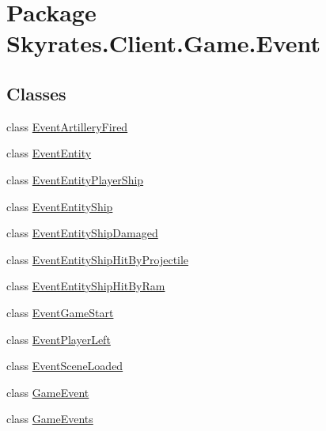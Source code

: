 \hypertarget{namespace_skyrates_1_1_client_1_1_game_1_1_event}{\section{Package Skyrates.\-Client.\-Game.\-Event}
\label{namespace_skyrates_1_1_client_1_1_game_1_1_event}
}
\subsection*{Classes}
\begin{DoxyCompactItemize}
\item 
class \hyperlink{class_skyrates_1_1_client_1_1_game_1_1_event_1_1_event_artillery_fired}{Event\-Artillery\-Fired}
\item 
class \hyperlink{class_skyrates_1_1_client_1_1_game_1_1_event_1_1_event_entity}{Event\-Entity}
\item 
class \hyperlink{class_skyrates_1_1_client_1_1_game_1_1_event_1_1_event_entity_player_ship}{Event\-Entity\-Player\-Ship}
\item 
class \hyperlink{class_skyrates_1_1_client_1_1_game_1_1_event_1_1_event_entity_ship}{Event\-Entity\-Ship}
\item 
class \hyperlink{class_skyrates_1_1_client_1_1_game_1_1_event_1_1_event_entity_ship_damaged}{Event\-Entity\-Ship\-Damaged}
\item 
class \hyperlink{class_skyrates_1_1_client_1_1_game_1_1_event_1_1_event_entity_ship_hit_by_projectile}{Event\-Entity\-Ship\-Hit\-By\-Projectile}
\item 
class \hyperlink{class_skyrates_1_1_client_1_1_game_1_1_event_1_1_event_entity_ship_hit_by_ram}{Event\-Entity\-Ship\-Hit\-By\-Ram}
\item 
class \hyperlink{class_skyrates_1_1_client_1_1_game_1_1_event_1_1_event_game_start}{Event\-Game\-Start}
\item 
class \hyperlink{class_skyrates_1_1_client_1_1_game_1_1_event_1_1_event_player_left}{Event\-Player\-Left}
\item 
class \hyperlink{class_skyrates_1_1_client_1_1_game_1_1_event_1_1_event_scene_loaded}{Event\-Scene\-Loaded}
\item 
class \hyperlink{class_skyrates_1_1_client_1_1_game_1_1_event_1_1_game_event}{Game\-Event}
\item 
class \hyperlink{class_skyrates_1_1_client_1_1_game_1_1_event_1_1_game_events}{Game\-Events}
\end{DoxyCompactItemize}
